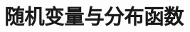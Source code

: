 \documentclass[../main.tex]{subfiles}
\begin{document}
\chapter{随机变量与分布函数}\label{chapter:ch03-随机变量与分布函数}






\end{document}

